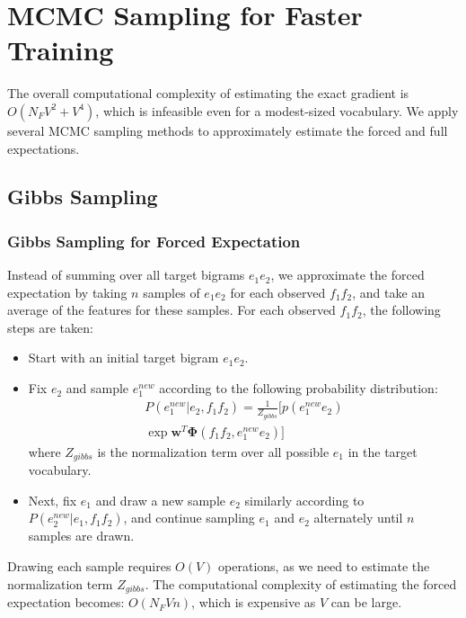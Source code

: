 \section{MCMC Sampling for Faster Training} 
The overall computational complexity of estimating the exact gradient is $O(N_F V^2 + V^4)$, which is infeasible even for a modest-sized vocabulary. 
We apply several MCMC sampling methods to approximately estimate the forced and full expectations.

\subsection{Gibbs Sampling}
\subsubsection{Gibbs Sampling for Forced Expectation}
Instead of summing over all target bigrams $e_1 e_2$, we approximate the forced expectation by taking $n$ samples of $e_1 e_2$ for each observed $f_1 f_2$, and take an average of the features for these samples. 
For each observed $f_1 f_2$, the following steps are taken:
\begin{itemize}
\item Start with an initial target bigram $e_1 e_2$.
\item Fix $e_2$ and sample $e_1^{new}$ according to the following probability distribution:
\begin{multline*}
P(e_1^{new}  | e_2, f_1f_2) = \frac{1}{Z_{gibbs}} \biggl [ p(e_1^{new} e_2) \\  \exp{\mathbf{w}^T\mathbf{\Phi}(f_1f_2, e_1^{new} e_2)} \biggr ]
\end{multline*}
where $Z_{gibbs}$ is the normalization term over all possible $e_1$ in the target vocabulary.
\item Next, fix $e_1$ and draw a new sample $e_2$ similarly according to $P(e_2^{new}  | e_1, f_1f_2)$, and continue sampling $e_1$ and $e_2$ alternately until $n$ samples are drawn.
\end{itemize}
Drawing each sample requires $O(V)$ operations, as we need to estimate the normalization term $Z_{gibbs}$. 
The computational complexity of estimating the forced expectation becomes: $O(N_F V n)$, which is expensive as $V$ can be large. 

